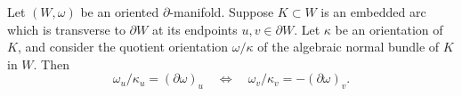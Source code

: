 Let $(W, \omega)$ be an oriented $\partial$-manifold. Suppose $K \subset W$ is an embedded arc which is transverse to $\partial W$ at its endpoints $u, v \in \partial W$. Let $\kappa$ be an orientation of $K$, and consider the quotient orientation $\omega/\kappa$ of the algebraic normal bundle of $K$ in $W$. Then
$$\omega_u / \kappa_u = (\partial \omega)_u \quad\Longleftrightarrow\quad \omega_v / \kappa_v = -(\partial \omega)_v.$$

